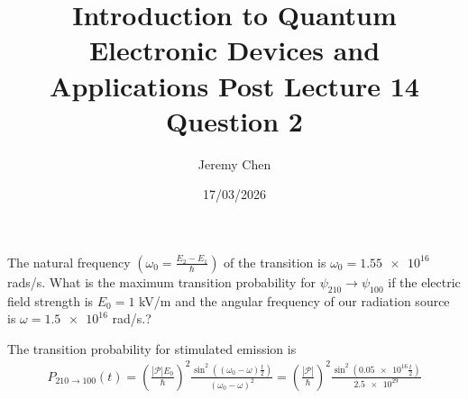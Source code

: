 \documentclass[10pt,letterpaper]{article}
\title{Introduction to Quantum Electronic Devices and Applications Post Lecture 14 Question 2}
\author{Jeremy Chen}
\date{17/03/2026}
\begin{document}
	\maketitle

\noindent The natural frequency $(\omega_{0} = \frac{E_{2} - E_{1}}{\hbar})$ of the transition is $\omega_{0} = \num{1.55e16}$ rads/s. What is the maximum transition probability for $\psi_{210} \rightarrow \psi_{100}$ if the electric field strength is $E_{0} = 1$ kV/m and the angular frequency of our radiation source is $\omega = \num{1.5e16}$ rad/s.?

\color{violet}
The transition probability for stimulated emission is
\begin{gather*}
P_{210 \rightarrow 100}(t) = \left( \frac{|\mathcal{P}|E_{0}}{\hbar} \right)^{2} \frac{\sin^{2}\left( (\omega_{0} - \omega) \frac{t}{2}\right)}{(\omega_{0} - \omega)^{2}} = \left( \frac{|\mathcal{P}|}{\hbar} \right)^{2} \frac{\sin^{2}\left( \num{0.05e16} \frac{t}{2} \right)}{\num{2.5e29}}
\end{gather*}
\color{black}
\end{document}
